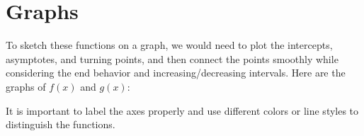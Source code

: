 \documentclass{article}
\begin{document}
\section{Graphs}

To sketch these functions on a graph, we would need to plot the intercepts, asymptotes, and turning points, and then connect the points smoothly while considering the end behavior and increasing/decreasing intervals. Here are the graphs of $f(x)$ and $g(x)$:

\begin{center}
\end{center}

It is important to label the axes properly and use different colors or line styles to distinguish the functions.
\end{document}
